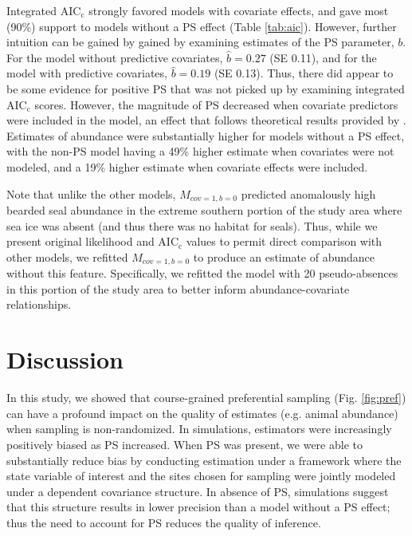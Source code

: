 \documentclass[times,mee,doublespace,]{besauth2}
\begin{document}
Integrated AIC$_\textrm{c}$ strongly favored models with covariate effects, and gave most (90\%) support to models without a PS effect (Table \ref{tab:aic}).  However, further intuition can be gained by gained by examining estimates of the PS parameter, $b$.  For the model without predictive covariates,  $\hat{b}=0.27$ (SE 0.11), and for the model with predictive covariates, $\hat{b}=0.19$ (SE 0.13).  Thus, there did appear to be some evidence for positive PS that was not picked up by examining integrated AIC$_\textrm{c}$ scores. However, the magnitude of PS decreased when covariate predictors were included in the model, an effect that follows theoretical results provided by \citet{PatiEtAl2011}.  Estimates of abundance were substantially higher for models without a PS effect, with the non-PS model having a 49\% higher estimate when covariates were not modeled, and a 19\% higher estimate when covariate effects were included.

Note that unlike the other models, $M_{cov=1,b=0}$ predicted anomalously high bearded seal abundance in the extreme southern portion of the study area where sea ice was absent (and thus there was no habitat for seals).  Thus, while we present original likelihood and AIC$_\textrm{c}$ values to permit direct comparison with other models, we refitted $M_{cov=1,b=0}$ to produce an estimate of abundance without this feature. Specifically, we refitted the model with 20 pseudo-absences in this portion of the study area to better inform abundance-covariate relationships.

\section{Discussion}

In this study, we showed that course-grained preferential sampling (Fig. \ref{fig:pref}) can have a profound impact on the quality of estimates (e.g. animal abundance) when sampling is non-randomized. In simulations, estimators were increasingly positively biased as PS increased. When PS was present, we were able to substantially reduce bias by conducting estimation under a framework where the state variable of interest and the sites chosen for sampling were jointly modeled under a dependent covariance structure.  In absence of PS, simulations suggest that this structure results in lower precision than a model without a PS effect; thus the need to account for PS reduces the quality of inference.
\end{document}
